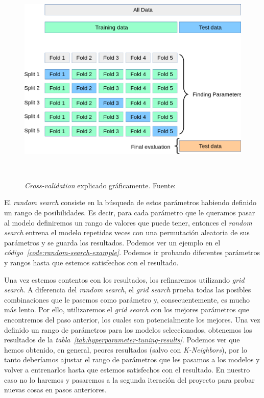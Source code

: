 \begin{figure}[!h]
    \centering
    \includegraphics[width=0.7\linewidth]{media/images/cross-validation.png}
    \caption{\textit{Cross-validation} explicado gráficamente. Fuente:\ \cite{31Crossv20:online}}\ \label{fig:cross-validation}
\end{figure}


El \textit{random search} consiste en la búsqueda de estos parámetros habiendo definido un rango de posibilidades. Es decir, para cada parámetro que le queramos
pasar al modelo definiremos un rango de valores que puede tener, entonces el \textit{random search} entrena el modelo repetidas veces con una permutación aleatoria de sus 
parámetros y se guarda los resultados. Podemos ver un ejemplo en el \textit{código\ \ref{code:random-search-example}}.
Podemos ir probando diferentes parámetros y rangos hasta que estemos satisfechos con el resultado.


Una vez estemos contentos con los resultados, los refinaremos utilizando \textit{grid search}. A diferencia del \textit{random search}, el \textit{grid search} prueba todas
las posibles combinaciones que le pasemos como parámetro y, consecuentemente, es mucho más lento. Por ello, utilizaremos el \textit{grid search} con los mejores parámetros que
encontremos del paso anterior, los cuales son potencialmente los mejores. Una vez definido un rango de parámetros para los modelos seleccionados, obtenemos los resultados
de la \textit{tabla\ \ref{tab:hyperparameter-tuning-results}}. Podemos ver que hemos obtenido, en general, peores resultados (salvo con \textit{K-Neighbors}), por lo tanto
deberíamos ajustar el rango de parámetros que les pasamos a los modelos y volver a entrenarlos hasta que estemos satisfechos con el resultado. En nuestro caso no lo haremos
y pasaremos a la segunda iteración del proyecto para probar nuevas cosas en pasos anteriores.


